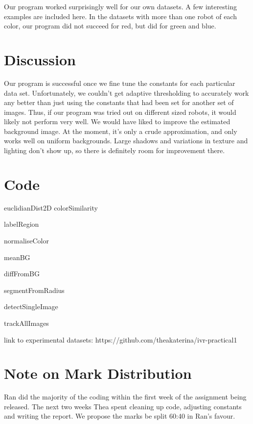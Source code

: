 \documentclass{report}
\begin{document}
Our program worked surprisingly well for our own datasets. A few interesting examples are included here.
In the datasets with more than one robot of each color, our program did not succeed for red, but did for green and blue. 

\chapter{Discussion}            

Our program is successful once we fine tune the constants for each particular data set. Unfortunately, we couldn't get adaptive thresholding to accurately work any better than just using the constants that had been set for another set of images. Thus, if our program was tried out on different sized robots, it would likely not perform very well. We would have liked to improve the estimated background image. At the moment, it's only a crude approximation, and only works well on uniform backgrounds. Large shadows and variations in texture and lighting don't show up, so there is definitely room for improvement there. 

\chapter{Code}
euclidianDist2D
colorSimilarity

labelRegion

normaliseColor

meanBG

diffFromBG

segmentFromRadius

detectSingleImage

trackAllImages


link to experimental datasets: https://github.com/theakaterina/ivr-practical1

\chapter{Note on Mark Distribution}
Ran did the majority of the coding within the first week of the assignment being released. The next two weeks Thea spent cleaning up code, adjusting constants and writing the report. We propose the marks be split 60:40 in Ran's favour.
\end{document}
